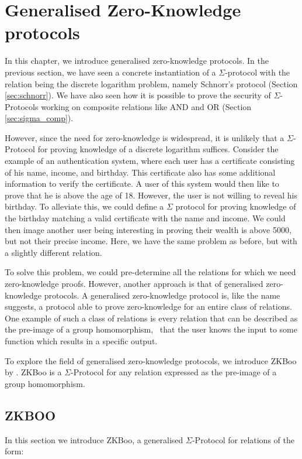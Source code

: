 \chapter{Generalised Zero-Knowledge protocols}
\label{ch:general_zk}
In this chapter, we introduce generalised zero-knowledge protocols.
In the previous section, we have seen a concrete instantiation of a
$\Sigma$-protocol with the relation being the discrete logarithm problem, namely
Schnorr's protocol (Section \ref{sec:schnorr}).
We have also seen how it is possible to prove the security of $\Sigma$-Protocols
working on composite relations like AND and OR (Section \ref{sec:sigma_comp}).

However, since the need for zero-knowledge is widespread, it is unlikely that a
$\Sigma$-Protocol for proving knowledge of a discrete logarithm suffices.
Consider the example of an authentication system, where each user has a
certificate consisting of his name, income, and birthday. This certificate also has some
additional information to verify the certificate.
A user of this system would then like to prove that he is above the age of 18.
However, the user is not willing to reveal his birthday. To alleviate this,
we could define a $\Sigma$ protocol for proving knowledge of the birthday matching
a valid certificate with the name and income.
We could then image another user being interesting in proving their wealth is
above 5000, but not their precise income. Here, we have the same problem as
before, but with a slightly different relation.

To solve this problem, we could pre-determine all the relations for which
we need zero-knowledge proofs. However, another approach is that of generalised
zero-knowledge protocols.
A generalised zero-knowledge protocol is, like the name suggests, a
protocol able to prove zero-knowledge for an entire class of relations.
One example of such a class of relations is every relation that can be
described as the pre-image of a group homomorphism, \ie\ that the user knows the
input to some function which results in a specific output.

To explore the field of generalised zero-knowledge protocols, we introduce ZKBoo
by \citet{zkboo}.
ZKBoo is a $\Sigma$-Protocol for any relation expressed as the
pre-image of a group homomorphism.
\section{ZKBOO}
\label{sec:zkboo}
In this section we introduce ZKBoo, a generalised $\Sigma$-Protocol for
relations of the form:

